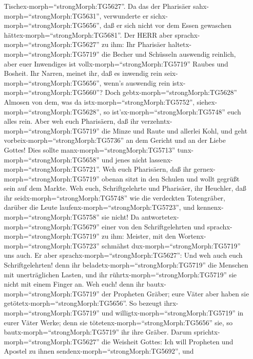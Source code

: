 Tischex-morph=``strongMorph:TG5627''.  Da das der Pharisäer
sahx-morph=``strongMorph:TG5631'', verwunderte er
sichx-morph=``strongMorph:TG5656'', daß er sich nicht vor dem Essen
gewaschen hättex-morph=``strongMorph:TG5681''.  Der HERR
aber sprachx-morph=``strongMorph:TG5627'' zu ihm: Ihr Pharisäer
haltetx-morph=``strongMorph:TG5719'' die Becher und Schüsseln auswendig
reinlich, aber euer Inwendiges ist vollx-morph=``strongMorph:TG5719''
Raubes und Bosheit.  Ihr Narren, meinet ihr, daß es
inwendig rein seix-morph=``strongMorph:TG5656'', wenn's auswendig rein
istx-morph=``strongMorph:TG5660''?  Doch
gebtx-morph=``strongMorph:TG5628'' Almosen von dem, was da
istx-morph=``strongMorph:TG5752'', siehex-morph=``strongMorph:TG5628'',
so ist'sx-morph=``strongMorph:TG5748'' euch alles rein. 
Aber weh euch Pharisäern, daß ihr verzehntx-morph=``strongMorph:TG5719''
die Minze und Raute und allerlei Kohl, und geht
vorbeix-morph=``strongMorph:TG5736'' an dem Gericht und an der Liebe
Gottes! Dies sollte manx-morph=``strongMorph:TG5713''
tunx-morph=``strongMorph:TG5658'' und jenes nicht
lassenx-morph=``strongMorph:TG5721''.  Weh euch Pharisäern,
daß ihr gernex-morph=``strongMorph:TG5719'' obenan sitzt in den Schulen
und wollt gegrüßt sein auf dem Markte.  Weh euch,
Schriftgelehrte und Pharisäer, ihr Heuchler, daß ihr
seidx-morph=``strongMorph:TG5748'' wie die verdeckten Totengräber,
darüber die Leute laufenx-morph=``strongMorph:TG5723'', und
kennenx-morph=``strongMorph:TG5758'' sie nicht!  Da
antwortetex-morph=``strongMorph:TG5679'' einer von den Schriftgelehrten
und sprachx-morph=``strongMorph:TG5719'' zu ihm: Meister, mit den
Wortenx-morph=``strongMorph:TG5723'' schmähst
dux-morph=``strongMorph:TG5719'' uns auch.  Er aber
sprachx-morph=``strongMorph:TG5627'': Und weh auch euch
Schriftgelehrten! denn ihr beladetx-morph=``strongMorph:TG5719'' die
Menschen mit unerträglichen Lasten, und ihr
rührtx-morph=``strongMorph:TG5719'' sie nicht mit einem Finger an.
 Weh euch! denn ihr bautx-morph=``strongMorph:TG5719'' der
Propheten Gräber; eure Väter aber haben sie
getötetx-morph=``strongMorph:TG5656''.  So bezeugt
ihrx-morph=``strongMorph:TG5719'' und
willigtx-morph=``strongMorph:TG5719'' in eurer Väter Werke; denn sie
tötetenx-morph=``strongMorph:TG5656'' sie, so
bautx-morph=``strongMorph:TG5719'' ihr ihre Gräber.  Darum
sprichtx-morph=``strongMorph:TG5627'' die Weisheit Gottes: Ich will
Propheten und Apostel zu ihnen sendenx-morph=``strongMorph:TG5692'', und

